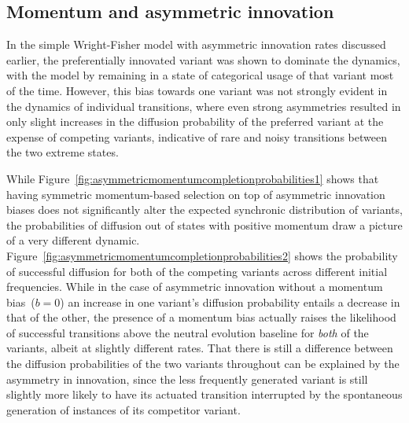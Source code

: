 \subsection{Momentum and asymmetric innovation}

In the simple Wright-Fisher model with asymmetric innovation rates discussed earlier, the preferentially innovated variant was shown to dominate the dynamics, with the model by remaining in a state of categorical usage of that variant most of the time.
However, this bias towards one variant was not strongly evident in the dynamics of individual transitions, where even strong asymmetries resulted in only slight increases in the diffusion probability of the preferred variant at the expense of competing variants, indicative of rare and noisy transitions between the two extreme states.

While Figure~\ref{fig:asymmetricmomentumcompletionprobabilities1} shows that having symmetric momentum-based selection on top of asymmetric innovation biases does not significantly alter the expected synchronic distribution of variants, the probabilities of diffusion out of states with positive momentum draw a picture of a very different dynamic.
Figure~\ref{fig:asymmetricmomentumcompletionprobabilities2} shows the probability of successful diffusion for both of the competing variants across different initial frequencies. While in the case of asymmetric innovation without a momentum bias~($b=0$) an increase in one variant's diffusion probability entails a decrease in that of the other, the presence of a momentum bias actually raises the likelihood of successful transitions above the neutral evolution baseline for \emph{both} of the variants, albeit at slightly different rates.
That there is still a difference between the diffusion probabilities of the two variants throughout can be explained by the asymmetry in innovation, since the less frequently generated variant is still slightly more likely to have its actuated transition interrupted by the spontaneous generation of instances of its competitor variant.

